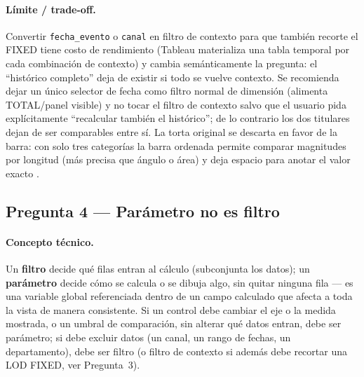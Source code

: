 \paragraph{Límite / trade-off.} Convertir \lstinline|fecha_evento| o \lstinline|canal| en filtro de contexto para que también recorte el FIXED tiene costo de rendimiento (Tableau materializa una tabla temporal por cada combinación de contexto) y cambia semánticamente la pregunta: el \enquote{histórico completo} deja de existir si todo se vuelve contexto. Se recomienda dejar un único selector de fecha como filtro normal de dimensión (alimenta TOTAL/panel visible) y no tocar el filtro de contexto salvo que el usuario pida explícitamente \enquote{recalcular también el histórico}; de lo contrario los dos titulares dejan de ser comparables entre sí. La torta original se descarta en favor de la barra: con solo tres categorías la barra ordenada permite comparar magnitudes por longitud (más precisa que ángulo o área) y deja espacio para anotar el valor exacto \citep{tufte2001visual,cleveland1984graphical}.

\subsection{Pregunta 4 --- Parámetro no es filtro}\label{ssec:c1-q4}

\paragraph{Concepto técnico.} Un \textbf{filtro} decide qué filas entran al cálculo (subconjunta los datos); un \textbf{parámetro} decide cómo se calcula o se dibuja algo, sin quitar ninguna fila — es una variable global referenciada dentro de un campo calculado que afecta a toda la vista de manera consistente. Si un control debe cambiar el eje o la medida mostrada, o un umbral de comparación, sin alterar qué datos entran, debe ser parámetro; si debe excluir datos (un canal, un rango de fechas, un departamento), debe ser filtro (o filtro de contexto si además debe recortar una LOD FIXED, ver Pregunta~3).

